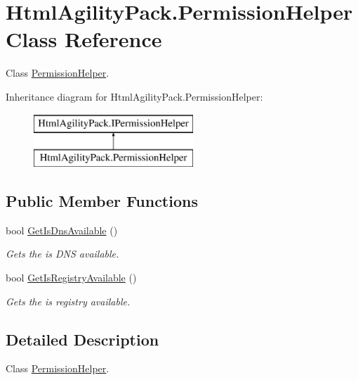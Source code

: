 \hypertarget{class_html_agility_pack_1_1_permission_helper}{}\section{Html\+Agility\+Pack.\+Permission\+Helper Class Reference}
\label{class_html_agility_pack_1_1_permission_helper}


Class \hyperlink{class_html_agility_pack_1_1_permission_helper}{Permission\+Helper}.  


Inheritance diagram for Html\+Agility\+Pack.\+Permission\+Helper\+:\begin{figure}[H]
\begin{center}
\leavevmode
\includegraphics[height=2.000000cm]{class_html_agility_pack_1_1_permission_helper}
\end{center}
\end{figure}
\subsection*{Public Member Functions}
\begin{DoxyCompactItemize}
\item 
bool \hyperlink{class_html_agility_pack_1_1_permission_helper_a4ee5ce910b0184b153acaea3305285e8}{Get\+Is\+Dns\+Available} ()
\begin{DoxyCompactList}\small\item\em Gets the is D\+NS available. \end{DoxyCompactList}\item 
bool \hyperlink{class_html_agility_pack_1_1_permission_helper_ab4317f2498d3a9997e6dba12abaf6842}{Get\+Is\+Registry\+Available} ()
\begin{DoxyCompactList}\small\item\em Gets the is registry available. \end{DoxyCompactList}\end{DoxyCompactItemize}


\subsection{Detailed Description}
Class \hyperlink{class_html_agility_pack_1_1_permission_helper}{Permission\+Helper}. 

